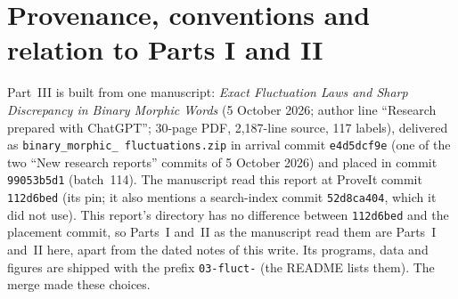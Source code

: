 \documentclass[11pt]{article}
\numberwithin{equation}{section}
\theoremstyle{definition}
\theoremstyle{remark}
\begin{document}
\section{Provenance, conventions and relation to Parts I and II}
\label{bmf:sec:provenance}
Part~III is built from one manuscript: \emph{Exact Fluctuation Laws and
Sharp Discrepancy in Binary Morphic Words} (5 October 2026; author line
``Research prepared with ChatGPT''; 30-page PDF, 2,187-line source, 117
labels), delivered as \texttt{binary\_\allowbreak morphic\_\allowbreak
fluctuations.zip} in arrival commit \texttt{e4d5dcf9e} (one of the two
``New research reports'' commits of 5 October 2026) and placed in commit
\texttt{99053b5d1} (batch~114). The manuscript read this report at ProveIt
commit \texttt{112d6bed} (its pin; it also mentions a search-index commit
\texttt{52d8ca404}, which it did not use). This report's directory has no
difference between \texttt{112d6bed} and the placement commit, so Parts~I
and~II as the manuscript read them are Parts~I and~II here, apart from the
dated notes of this write. Its programs, data and figures are shipped with
the prefix \texttt{03-fluct-} (the README lists them). The merge made these
choices.
\end{document}
